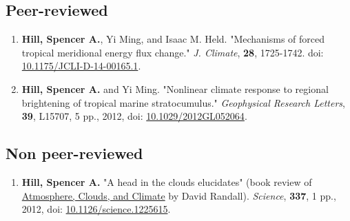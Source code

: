 \documentclass{article}
\begin{document}
\subsection*{Peer-reviewed}
\label{sec:orgheadline6}
\begin{enumerate}
\item \textbf{Hill, Spencer A.}, Yi Ming, and Isaac M. Held. "Mechanisms of forced tropical
meridional energy flux change."  \emph{J. Climate}, \textbf{28}, 1725-1742.  doi:
\href{http://dx.doi.org/10.1175/JCLI-D-14-00165.1}{10.1175/JCLI-D-14-00165.1}.
\item \textbf{Hill, Spencer A.} and Yi Ming. "Nonlinear climate response to regional
brightening of tropical marine stratocumulus."  \emph{Geophysical Research Letters},
\textbf{39}, L15707, 5 pp., 2012, doi: \href{http://dx.doi.org/10.1029/2012GL052064}{10.1029/2012GL052064}.
\end{enumerate}
\subsection*{Non peer-reviewed}
\label{sec:orgheadline7}
\begin{enumerate}
\item \textbf{Hill, Spencer A.} "A head in the clouds elucidates" (book review of
\href{http://press.princeton.edu/titles/9773.html}{Atmosphere, Clouds, and Climate} by David Randall). \emph{Science}, \textbf{337}, 1 pp., 2012,
doi: \href{http://dx.doi.org/10.1126/science.1225615}{10.1126/science.1225615}.
\end{enumerate}
\end{document}
